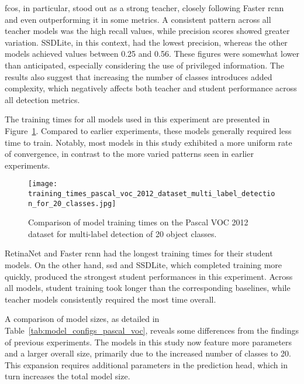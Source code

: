 \gls{fcos}, in particular, stood out as a strong teacher, closely following Faster \gls{rcnn} and even outperforming it in some metrics. A consistent pattern across all teacher models was the high recall values, while precision scores showed greater variation. SSDLite, in this context, had the lowest precision, whereas the other models achieved values between 0.25 and 0.56. These figures were somewhat lower than anticipated, especially considering the use of privileged information. The results also suggest that increasing the number of classes introduces added complexity, which negatively affects both teacher and student performance across all detection metrics.

The training times for all models used in this experiment are presented in Figure~\ref{fig:pascal_voc_training_time}. Compared to earlier experiments, these models generally required less time to train. Notably, most models in this study exhibited a more uniform rate of convergence, in contrast to the more varied patterns seen in earlier experiments.

\begin{figure}[!ht]
    \centering
    \texttt{[image: training\_times\_pascal\_voc\_2012\_dataset\_multi\_label\_detection\_for\_20\_classes.jpg]}
    \caption{Comparison of model training times on the Pascal VOC 2012 dataset for multi-label detection of 20 object classes.}
    \label{fig:pascal_voc_training_time}
\end{figure}

RetinaNet and Faster \gls{rcnn} had the longest training times for their student models. On the other hand, \gls{ssd} and SSDLite, which completed training more quickly, produced the strongest student performances in this experiment. Across all models, student training took longer than the corresponding baselines, while teacher models consistently required the most time overall.

A comparison of model sizes, as detailed in Table~\ref{tab:model_configs_pascal_voc}, reveals some differences from the findings of previous experiments. The models in this study now feature more parameters and a larger overall size, primarily due to the increased number of classes to 20. This expansion requires additional parameters in the prediction head, which in turn increases the total model size.

